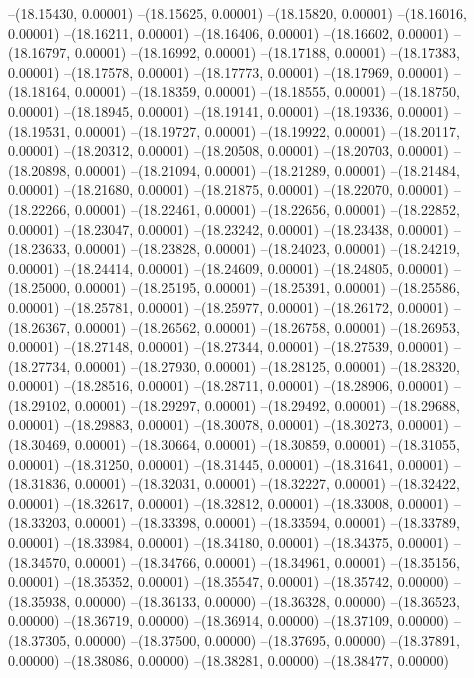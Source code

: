 --(18.15430, 0.00001)
--(18.15625, 0.00001)
--(18.15820, 0.00001)
--(18.16016, 0.00001)
--(18.16211, 0.00001)
--(18.16406, 0.00001)
--(18.16602, 0.00001)
--(18.16797, 0.00001)
--(18.16992, 0.00001)
--(18.17188, 0.00001)
--(18.17383, 0.00001)
--(18.17578, 0.00001)
--(18.17773, 0.00001)
--(18.17969, 0.00001)
--(18.18164, 0.00001)
--(18.18359, 0.00001)
--(18.18555, 0.00001)
--(18.18750, 0.00001)
--(18.18945, 0.00001)
--(18.19141, 0.00001)
--(18.19336, 0.00001)
--(18.19531, 0.00001)
--(18.19727, 0.00001)
--(18.19922, 0.00001)
--(18.20117, 0.00001)
--(18.20312, 0.00001)
--(18.20508, 0.00001)
--(18.20703, 0.00001)
--(18.20898, 0.00001)
--(18.21094, 0.00001)
--(18.21289, 0.00001)
--(18.21484, 0.00001)
--(18.21680, 0.00001)
--(18.21875, 0.00001)
--(18.22070, 0.00001)
--(18.22266, 0.00001)
--(18.22461, 0.00001)
--(18.22656, 0.00001)
--(18.22852, 0.00001)
--(18.23047, 0.00001)
--(18.23242, 0.00001)
--(18.23438, 0.00001)
--(18.23633, 0.00001)
--(18.23828, 0.00001)
--(18.24023, 0.00001)
--(18.24219, 0.00001)
--(18.24414, 0.00001)
--(18.24609, 0.00001)
--(18.24805, 0.00001)
--(18.25000, 0.00001)
--(18.25195, 0.00001)
--(18.25391, 0.00001)
--(18.25586, 0.00001)
--(18.25781, 0.00001)
--(18.25977, 0.00001)
--(18.26172, 0.00001)
--(18.26367, 0.00001)
--(18.26562, 0.00001)
--(18.26758, 0.00001)
--(18.26953, 0.00001)
--(18.27148, 0.00001)
--(18.27344, 0.00001)
--(18.27539, 0.00001)
--(18.27734, 0.00001)
--(18.27930, 0.00001)
--(18.28125, 0.00001)
--(18.28320, 0.00001)
--(18.28516, 0.00001)
--(18.28711, 0.00001)
--(18.28906, 0.00001)
--(18.29102, 0.00001)
--(18.29297, 0.00001)
--(18.29492, 0.00001)
--(18.29688, 0.00001)
--(18.29883, 0.00001)
--(18.30078, 0.00001)
--(18.30273, 0.00001)
--(18.30469, 0.00001)
--(18.30664, 0.00001)
--(18.30859, 0.00001)
--(18.31055, 0.00001)
--(18.31250, 0.00001)
--(18.31445, 0.00001)
--(18.31641, 0.00001)
--(18.31836, 0.00001)
--(18.32031, 0.00001)
--(18.32227, 0.00001)
--(18.32422, 0.00001)
--(18.32617, 0.00001)
--(18.32812, 0.00001)
--(18.33008, 0.00001)
--(18.33203, 0.00001)
--(18.33398, 0.00001)
--(18.33594, 0.00001)
--(18.33789, 0.00001)
--(18.33984, 0.00001)
--(18.34180, 0.00001)
--(18.34375, 0.00001)
--(18.34570, 0.00001)
--(18.34766, 0.00001)
--(18.34961, 0.00001)
--(18.35156, 0.00001)
--(18.35352, 0.00001)
--(18.35547, 0.00001)
--(18.35742, 0.00000)
--(18.35938, 0.00000)
--(18.36133, 0.00000)
--(18.36328, 0.00000)
--(18.36523, 0.00000)
--(18.36719, 0.00000)
--(18.36914, 0.00000)
--(18.37109, 0.00000)
--(18.37305, 0.00000)
--(18.37500, 0.00000)
--(18.37695, 0.00000)
--(18.37891, 0.00000)
--(18.38086, 0.00000)
--(18.38281, 0.00000)
--(18.38477, 0.00000)
